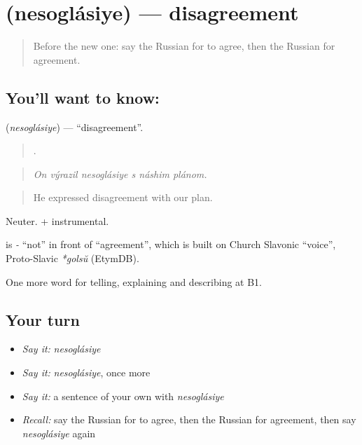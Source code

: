 \section[\texorpdfstring{\ru{несогласие} (nesoglásiye)}{несогласие (nesoglásiye)}]{ (nesoglásiye) — disagreement}

\label{lesson:RU-C340-nesoglasie}



\begin{quote}
Before the new one: say the Russian for to agree, then the Russian for agreement.
\end{quote}

\subsection*{You'll want to know: }
\textbf{} (\emph{nesoglásiye}) — \textquotedblleft{}disagreement\textquotedblright{}.

\begin{quote}
     .
\end{quote}

\begin{quote}
\emph{On výrazil nesoglásiye s náshim plánom.}
\end{quote}

\begin{quote}
He expressed disagreement with our plan.
\end{quote}

Neuter. \emph{ } + instrumental.

\begin{cousinweb}
\textbf{} is \emph{-} \textquotedblleft{}not\textquotedblright{} in front of \emph{} \textquotedblleft{}agreement\textquotedblright{}, which is built on Church Slavonic \emph{} \textquotedblleft{}voice\textquotedblright{}, Proto-Slavic \emph{*golsŭ} (EtymDB).
\end{cousinweb}

\begin{grammarlens}[title={What you've built}]
One more word for telling, explaining and describing at B1.
\end{grammarlens}

\subsection*{Your turn}
\begin{itemize}
\raggedright
  \item \emph{Say it:} \emph{nesoglásiye}
  \item \emph{Say it:} \emph{nesoglásiye}, once more
  \item \emph{Say it:} a sentence of your own with \emph{nesoglásiye}
  \item \emph{Recall:} say the Russian for to agree, then the Russian for agreement, then say \emph{nesoglásiye} again
\end{itemize}

